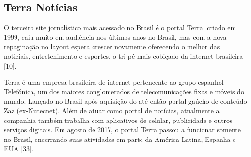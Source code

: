 \documentclass[a4paper]{article}
\begin{document}
\begin{titlepage}
\subsection{Terra Notícias}

O terceiro site jornalístico mais acessado no Brasil é o portal Terra, criado em 1999, caiu muito em audiência nos últimos anos no Brasil, mas com a nova repaginação no layout espera crescer novamente oferecendo o melhor das noticiais, entretenimento e esportes, o tri-pé mais cobiçado da internet brasileira [10].

Terra é uma empresa brasileira de internet pertencente ao grupo espanhol Telefónica, um dos maiores conglomerados de telecomunicações fixas e móveis do mundo. Lançado no Brasil após aquisição do até então portal gaúcho de conteúdo Zaz (ex-Nutecnet). Além de atuar como portal de notícias, atualmente a companhia também trabalha com aplicativos de celular, publicidade e outros serviços digitais. Em agosto de 2017, o portal Terra passou a funcionar somente no Brasil, encerrando suas atividades em parte da América Latina, Espanha e EUA [33].


\end{titlepage}
\end{document}
